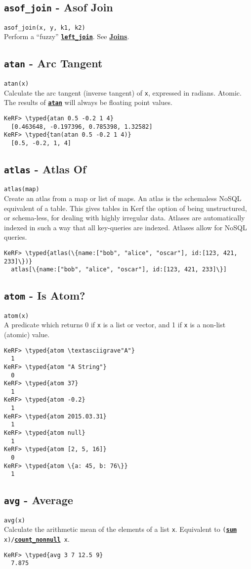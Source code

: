 \documentclass{article}
\newcommand{\typed}[1]{\textcolor{TealBlue}{#1}}
\newcommand{\primdefu}[3]{\subsection{\texttt{#1} - #2}\label{prim:#3}}
\newcommand{\primu}[2]{\hyperref[prim:#2]{\textbf{\texttt{#1}}}}
\newcommand{\primdef}[2]{\primdefu{#1}{#2}{#1}}
\newcommand{\prim}[1]{\primu{#1}{#1}}
\begin{document}
\primdefu{asof\_join}{Asof Join}{asofJoin}
\texttt{asof\_join(x, y, k1, k2)}\\

Perform a ``fuzzy'' \primu{left\_join}{leftJoin}. See \hyperref[sec:joins]{\textbf{Joins}}.

\primdef{atan}{Arc Tangent}
\texttt{atan(x)}\\

Calculate the arc tangent (inverse tangent) of \texttt{x}, expressed in radians. Atomic. The results of \prim{atan} will always be floating point values.
\begin{Verbatim}
KeRF> \typed{atan 0.5 -0.2 1 4}
  [0.463648, -0.197396, 0.785398, 1.32582]
KeRF> \typed{tan(atan 0.5 -0.2 1 4)}
  [0.5, -0.2, 1, 4]
\end{Verbatim}

\primdef{atlas}{Atlas Of}
\texttt{atlas(map)}\\

Create an atlas from a map or list of maps. An atlas is the schemaless NoSQL equivalent of a table. This gives tables in Kerf the option of being unstructured, or schema-less, for dealing with highly irregular data. Atlases are automatically indexed in such a way that all key-queries are indexed. Atlases allow for NoSQL queries.
\begin{Verbatim}
KeRF> \typed{atlas(\{name:["bob", "alice", "oscar"], id:[123, 421, 233]\})}
  atlas[\{name:["bob", "alice", "oscar"], id:[123, 421, 233]\}]
\end{Verbatim}

\pagebreak
\primdef{atom}{Is Atom?}
\texttt{atom(x)}\\

A predicate which returns 0 if \texttt{x} is a list or vector, and 1 if \texttt{x} is a non-list (atomic) value.
\begin{Verbatim}
KeRF> \typed{atom \textasciigrave"A"}
  1
KeRF> \typed{atom "A String"}
  0
KeRF> \typed{atom 37}
  1
KeRF> \typed{atom -0.2}
  1
KeRF> \typed{atom 2015.03.31}
  1
KeRF> \typed{atom null}
  1
KeRF> \typed{atom [2, 5, 16]}
  0
KeRF> \typed{atom \{a: 45, b: 76\}}
  1
\end{Verbatim}

\primdef{avg}{Average}
\texttt{avg(x)}\\

Calculate the arithmetic mean of the elements of a list \texttt{x}. Equivalent to \texttt{(\prim{sum} x)/\primu{count\_nonnull}{countNonnull} x}.
\begin{Verbatim}
KeRF> \typed{avg 3 7 12.5 9}
  7.875
\end{Verbatim}
\end{document}
